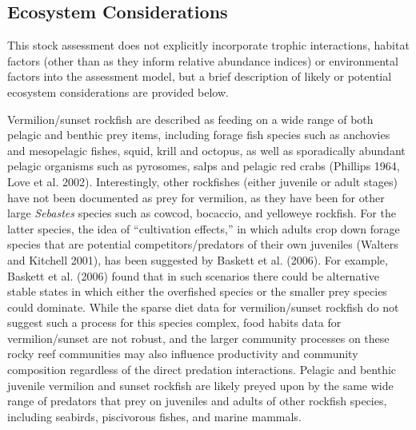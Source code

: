 \documentclass[11pt,
  english,
  a4paper,
]{article}
\begin{document}

\hypertarget{ecosystem-considerations}{%
\subsection{Ecosystem Considerations}\label{ecosystem-considerations}}

\leavevmode\tagmcend\tagstructend

This stock assessment does not explicitly incorporate trophic interactions, habitat factors (other than as they inform relative abundance indices) or environmental factors into the assessment model, but a brief description of likely or potential ecosystem considerations are provided below.

Vermilion/sunset rockfish are described as feeding on a wide range of both pelagic and benthic prey items, including forage fish species such as anchovies and mesopelagic fishes, squid, krill and octopus, as well as sporadically abundant pelagic organisms such as pyrosomes, salps and pelagic red crabs {(Phillips 1964, Love et al. 2002)\leavevmode\tagmcend\tagstructend}. Interestingly, other rockfishes (either juvenile or adult stages) have not been documented as prey for vermilion, as they have been for other large \emph{Sebastes} species such as cowcod, bocaccio, and yelloweye rockfish. For the latter species, the idea of ``cultivation effects,'' in which adults crop down forage species that are potential competitors/predators of their own juveniles {(Walters and Kitchell 2001)\leavevmode\tagmcend\tagstructend}, has been suggested by {Baskett et al. (2006)\leavevmode\tagmcend\tagstructend}. For example, Baskett et al. {(2006)\leavevmode\tagmcend\tagstructend} found that in such scenarios there could be alternative stable states in which either the overfished species or the smaller prey species could dominate. While the sparse diet data for vermilion/sunset rockfish do not suggest such a process for this species complex, food habits data for vermilion/sunset are not robust, and the larger community processes on these rocky reef communities may also influence productivity and community composition regardless of the direct predation interactions. Pelagic and benthic juvenile vermilion and sunset rockfish are likely preyed upon by the same wide range of predators that prey on juveniles and adults of other rockfish species, including seabirds, piscivorous fishes, and marine mammals.
\end{document}
